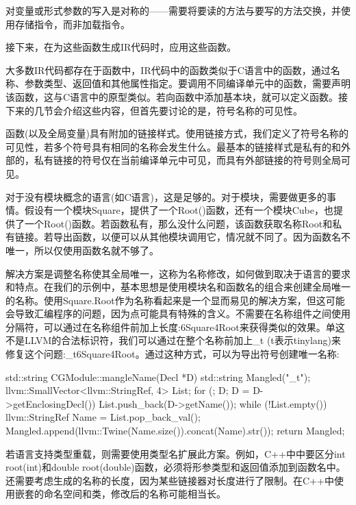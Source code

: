 对变量或形式参数的写入是对称的——需要将要读的方法与要写的方法交换，并使用存储指令，而非加载指令。

接下来，在为这些函数生成IR代码时，应用这些函数。


大多数IR代码都存在于函数中，IR代码中的函数类似于C语言中的函数，通过名称、参数类型、返回值和其他属性指定。要调用不同编译单元中的函数，需要声明该函数，这与C语言中的原型类似。若向函数中添加基本块，就可以定义函数。接下来的几节会介绍这些内容，但首先要讨论的是，符号名称的可见性。



函数(以及全局变量)具有附加的链接样式。使用链接方式，我们定义了符号名称的可见性，若多个符号具有相同的名称会发生什么。最基本的链接样式是私有的和外部的，私有链接的符号仅在当前编译单元中可见，而具有外部链接的符号则全局可见。

对于没有模块概念的语言(如C语言)，这是足够的。对于模块，需要做更多的事情。假设有一个模块Square，提供了一个Root()函数，还有一个模块Cube，也提供了一个Root()函数。若函数私有，那么没什么问题，该函数获取名称Root和私有链接。若导出函数，以便可以从其他模块调用它，情况就不同了。因为函数名不唯一，所以仅使用函数名就不够了。

解决方案是调整名称使其全局唯一，这称为名称修改，如何做到取决于语言的要求和特点。在我们的示例中，基本思想是使用模块名和函数名的组合来创建全局唯一的名称。使用Square.Root作为名称看起来是一个显而易见的解决方案，但这可能会导致汇编程序的问题，因为点可能具有特殊的含义。不需要在名称组件之间使用分隔符，可以通过在名称组件前加上长度:6Square4Root来获得类似的效果。单这不是LLVM的合法标识符，我们可以通过在整个名称前加上\_t (t表示tinylang)来修复这个问题:\_t6Square4Root。通过这种方式，可以为导出符号创建唯一名称:

\begin{cpp}
std::string CGModule::mangleName(Decl *D) {
    std::string Mangled("_t");
    llvm::SmallVector<llvm::StringRef, 4> List;
    for (; D; D = D->getEnclosingDecl())
        List.push_back(D->getName());
    while (!List.empty()) {
        llvm::StringRef Name = List.pop_back_val();
        Mangled.append(llvm::Twine(Name.size()).concat(Name).str());
    }
    return Mangled;
}
\end{cpp}

若语言支持类型重载，则需要使用类型名扩展此方案。例如，C++中中要区分int root(int)和double root(double)函数，必须将形参类型和返回值添加到函数名中。还需要考虑生成的名称的长度，因为某些链接器对长度进行了限制。在C++中使用嵌套的命名空间和类，修改后的名称可能相当长。

